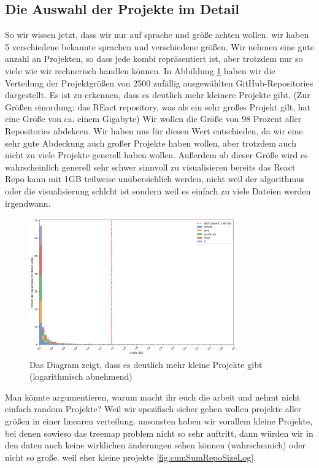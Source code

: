 \subsection{Die Auswahl der Projekte im Detail} \label{sec:auswahlDerProjekteImDetail}
So wir wissen jetzt, dass wir nur auf sprache und größe achten wollen. wir haben 5 verschiedene bekannte sprachen und verschiedene größen. Wir nehmen eine gute anzahl an Projekten, so dass jede kombi repräsentiert ist, aber trotzdem nur so viele wie wir rechnerisch handlen können. 
In Abbildung \ref{fig:repoGroesseVerteilungUnfiltered} haben wir die Verteilung der Projektgrößen von 2500 zufällig ausgewählten GitHub-Repositories dargestellt. Es ist zu erkennen, dass es deutlich mehr kleinere Projekte gibt. (Zur Größen einordung: das REact repository, was als ein sehr großes Projekt gilt, hat eine Größe von ca.  einem Gigabyte)
Wir wollen die Größe von 98 Prozent aller Repositories abdekcen. Wir haben uns für diesen Wert entschieden, da wir eine sehr gute Abdeckung auch großer Projekte haben wollen, aber trotzdem auch nicht zu viele Projekte generell haben wollen. Außerdem ab dieser Größe wird es wahrscheinlich generell sehr schwer sinnvoll zu visualisieren bereits das React Repo kann mit 1GB teilweise unübersichlich werden, nicht weil der algorithmus oder die visualisierung schlcht ist sondern weil es einfach zu viele Dateien werden irgendwann. %

\begin{figure}
    \centering
    \includegraphics[width=0.8\textwidth]{images/datenanalyse/repoSizeUnfilteredVerteilung.png}
    \caption{Das Diagram zeigt, dass es deutlich mehr kleine Projekte gibt (logarithmisch abnehmend)}
    \label{fig:repoGroesseVerteilungUnfiltered}
\end{figure}

Man könnte argumentieren, warum macht ihr euch die arbeit und nehmt nicht einfach random Projekte? Weil wir spezifisch sicher gehen wollen projekte aller größen in einer linearen verteilung. ansonsten haben wir vorallem kleine Projekte, bei denen sowieso das treemap problem nicht so sehr auftritt, dann würden wir in den daten auch keine wirklichen änderungen sehen können (wahrscheinich) oder nicht so große. weil eher kleine projekte \ref{fig:cumSumRepoSizeLog}.

